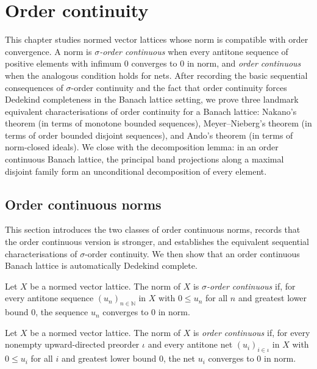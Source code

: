 \chapter{Order continuity}

This chapter studies normed vector lattices whose norm is compatible
with order convergence. A norm is \emph{$\sigma$-order continuous}
when every antitone sequence of positive elements with infimum $0$
converges to $0$ in norm, and \emph{order continuous} when the
analogous condition holds for nets. After recording the basic
sequential consequences of $\sigma$-order continuity and the fact
that order continuity forces Dedekind completeness in the Banach
lattice setting, we prove three landmark equivalent
characterisations of order continuity for a Banach lattice:
Nakano's theorem (in terms of monotone bounded sequences),
Meyer--Nieberg's theorem (in terms of order bounded disjoint
sequences), and Ando's theorem (in terms of norm-closed ideals).
We close with the decomposition lemma: in an order continuous
Banach lattice, the principal band projections along a maximal
disjoint family form an unconditional decomposition of every
element.

\section{Order continuous norms}

This section introduces the two classes of order continuous norms,
records that the order continuous version is stronger, and
establishes the equivalent sequential characterisations of
$\sigma$-order continuity. We then show that an order continuous
Banach lattice is automatically Dedekind complete.

\begin{definition}
\label{def:isSigmaOrderContinuousNorm}
\leanok
{}
Let $X$ be a normed vector lattice. The norm of $X$ is
\emph{$\sigma$-order continuous} if, for every antitone sequence
$(u_n)_{n \in \mathbb{N}}$ in $X$ with $0 \le u_n$ for all $n$ and
greatest lower bound $0$, the sequence $u_n$ converges to $0$ in
norm.
\end{definition}

\begin{definition}
\label{def:isOrderContinuousNorm}
\leanok
{}
Let $X$ be a normed vector lattice. The norm of $X$ is
\emph{order continuous} if, for every nonempty upward-directed
preorder $\iota$ and every antitone net $(u_i)_{i \in \iota}$ in
$X$ with $0 \le u_i$ for all $i$ and greatest lower bound $0$, the
net $u_i$ converges to $0$ in norm.
\end{definition}

